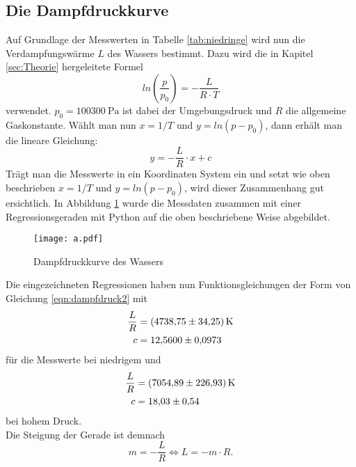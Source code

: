 \subsection{Die Dampfdruckkurve}
Auf Grundlage der Messwerten in Tabelle \ref{tab:niedringe} wird nun die Verdampfungswärme $L$ des
Wassers bestimmt. Dazu wird die in Kapitel \ref{sec:Theorie} hergeleitete Formel
\begin{equation}
  ln(\frac{p}{p_0})=-\frac{L}{R\cdot T} \label{eqn:dampfdruck1}
\end{equation}
verwendet. $p_0=\SI{100300}{\pascal}$ ist dabei der Umgebungsdruck und $R$ die allgemeine Gaskonstante.
Wählt man nun $x=1/T$ und $y=ln(p-p_0)$, dann erhält man die lineare Gleichung:
\begin{equation}
  y=-\frac{L}{R}\cdot x+c \label{eqn:dampfdruck2}
\end{equation}
Trägt man die Messwerte in ein Koordinaten System ein und setzt wie oben beschrieben $x=1/T$ und $y=ln(p-p_0)$,
wird dieser Zusammenhang gut ersichtlich. In Abbildung \ref{fig:Dampfdruckkurve} wurde die Messdaten
zusammen mit einer Regressionsgeraden mit Python auf die oben beschriebene Weise abgebildet. 
\begin{figure}
  \centering
  \texttt{[image: a.pdf]}
  \caption{Dampfdruckkurve des Wassers}
  \label{fig:Dampfdruckkurve}
\end{figure}
Die eingezeichneten Regressionen haben nun Funktionsgleichungen der Form von Gleichung \eqref{eqn:dampfdruck2} mit
\begin{align}
  \frac{L}{R} &= \SI{4738.75 \pm 34.25}{\kelvin} \\
  c           &= \num{12.56 \pm 0.0973} 
\end{align}
für die Messwerte bei niedrigem und
\begin{align}
  \frac{L}{R} &=  \SI{7054.89 \pm 226.93}{\kelvin}\\
  c           & =\num{18.03 \pm 0.54}
\end{align}
bei hohem Druck.
\\
Die Steigung der Gerade ist demnach
\begin{equation}
  m=-\frac{L}{R} \Leftrightarrow L=-m\cdot R. \label{eqn:L}
\end{equation}

